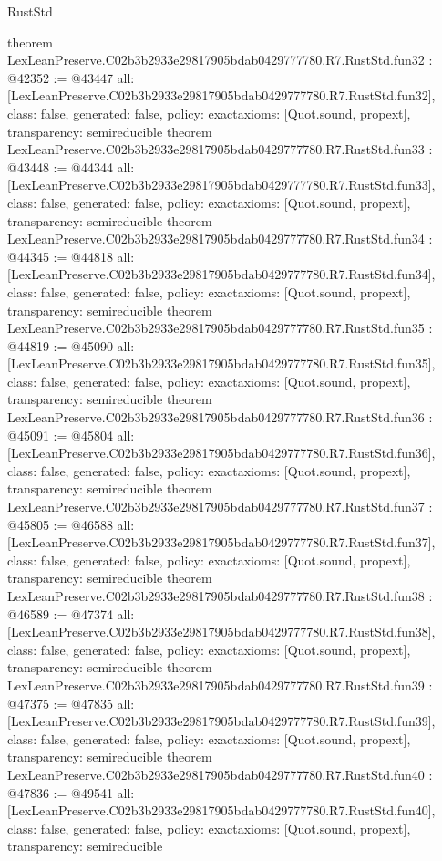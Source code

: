 \begin{lexlean}{RustStd}
\begin{coremodule}
{}
theorem LexLeanPreserve.C02b3b2933e29817905bdab0429777780.R7.RustStd.fun32 : @42352 := @43447 {
  all: [LexLeanPreserve.C02b3b2933e29817905bdab0429777780.R7.RustStd.fun32],
  class: false,
  generated: false,
  policy: exact{axioms: [Quot.sound, propext]},
  transparency: semireducible
}
theorem LexLeanPreserve.C02b3b2933e29817905bdab0429777780.R7.RustStd.fun33 : @43448 := @44344 {
  all: [LexLeanPreserve.C02b3b2933e29817905bdab0429777780.R7.RustStd.fun33],
  class: false,
  generated: false,
  policy: exact{axioms: [Quot.sound, propext]},
  transparency: semireducible
}
theorem LexLeanPreserve.C02b3b2933e29817905bdab0429777780.R7.RustStd.fun34 : @44345 := @44818 {
  all: [LexLeanPreserve.C02b3b2933e29817905bdab0429777780.R7.RustStd.fun34],
  class: false,
  generated: false,
  policy: exact{axioms: [Quot.sound, propext]},
  transparency: semireducible
}
theorem LexLeanPreserve.C02b3b2933e29817905bdab0429777780.R7.RustStd.fun35 : @44819 := @45090 {
  all: [LexLeanPreserve.C02b3b2933e29817905bdab0429777780.R7.RustStd.fun35],
  class: false,
  generated: false,
  policy: exact{axioms: [Quot.sound, propext]},
  transparency: semireducible
}
theorem LexLeanPreserve.C02b3b2933e29817905bdab0429777780.R7.RustStd.fun36 : @45091 := @45804 {
  all: [LexLeanPreserve.C02b3b2933e29817905bdab0429777780.R7.RustStd.fun36],
  class: false,
  generated: false,
  policy: exact{axioms: [Quot.sound, propext]},
  transparency: semireducible
}
theorem LexLeanPreserve.C02b3b2933e29817905bdab0429777780.R7.RustStd.fun37 : @45805 := @46588 {
  all: [LexLeanPreserve.C02b3b2933e29817905bdab0429777780.R7.RustStd.fun37],
  class: false,
  generated: false,
  policy: exact{axioms: [Quot.sound, propext]},
  transparency: semireducible
}
theorem LexLeanPreserve.C02b3b2933e29817905bdab0429777780.R7.RustStd.fun38 : @46589 := @47374 {
  all: [LexLeanPreserve.C02b3b2933e29817905bdab0429777780.R7.RustStd.fun38],
  class: false,
  generated: false,
  policy: exact{axioms: [Quot.sound, propext]},
  transparency: semireducible
}
theorem LexLeanPreserve.C02b3b2933e29817905bdab0429777780.R7.RustStd.fun39 : @47375 := @47835 {
  all: [LexLeanPreserve.C02b3b2933e29817905bdab0429777780.R7.RustStd.fun39],
  class: false,
  generated: false,
  policy: exact{axioms: [Quot.sound, propext]},
  transparency: semireducible
}
theorem LexLeanPreserve.C02b3b2933e29817905bdab0429777780.R7.RustStd.fun40 : @47836 := @49541 {
  all: [LexLeanPreserve.C02b3b2933e29817905bdab0429777780.R7.RustStd.fun40],
  class: false,
  generated: false,
  policy: exact{axioms: [Quot.sound, propext]},
  transparency: semireducible
}
\end{coremodule}
\end{lexlean}
